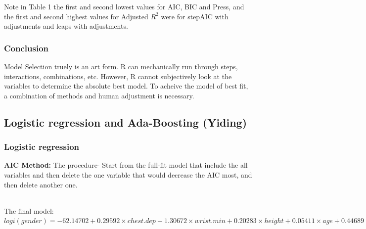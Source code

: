 \documentclass[11pt]{article}\usepackage[]{graphicx}\usepackage[]{color}
\begin{document}
Note in Table 1 the first and second lowest values for AIC, BIC and Press, and the first and second highest values for Adjusted $R^2$ were for stepAIC with adjustments and leaps with adjustments.

\subsubsection{Conclusion}
Model Selection truely is an art form. R can mechanically run through steps, interactions, combinations, etc. However, R cannot subjectively look at the variables to determine the absolute best model. To acheive the model of best fit, a combination of methods and human adjustment is necessary.

\newpage

\subsection{Logistic regression and Ada-Boosting (Yiding)}

\subsubsection{Logistic regression}

\textbf{AIC Method:} The procedure- Start from the full-fit model that include the all variables and then delete the one variable that would decrease the AIC most, and then delete another one.
\begin{table}[ht]
\centering
{}
\end{table}
\\
The final model: $logi(gender)=-62.14702 +0.29592\times chest.dep + 1.30672\times wrist.min + 0.20283\times height + 0.05411\times age + 0.44689\times shoulder - 0.50595\times hip$\\
\end{document}
